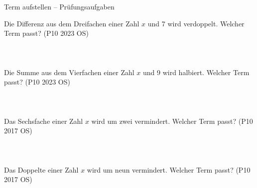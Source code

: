 \setcounter{aufgabe}{23}

\begin{aufgabe}{Term aufstellen – Prüfungsaufgaben}
\begin{teile}
\teil Die Differenz aus dem Dreifachen einer Zahl $x$ und 7 wird verdoppelt. Welcher Term passt? \hfill (P10 2023 OS) \\  \\  \\  \\ 
\teil Die Summe aus dem Vierfachen einer Zahl $x$ und 9 wird halbiert. Welcher Term passt? \hfill (P10 2023 OS) \\  \\  \\  \\ 
\teil Das Sechsfache einer Zahl $x$ wird um zwei vermindert. Welcher Term passt? \hfill (P10 2017 OS) \\  \\  \\  \\ 
\teil Das Doppelte einer Zahl $x$ wird um neun vermindert. Welcher Term passt? \hfill (P10 2017 OS) \\  \\  \\  \\ 
\end{teile}
\end{aufgabe}
